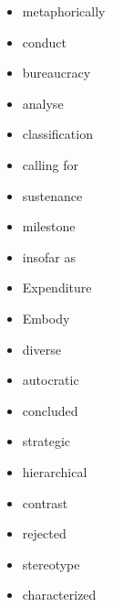 \documentclass[a4paper,10pt]{article}
\theoremstyle{discussion_style} \newtheorem{discussion}{\color{red}{Discussion point}}
\theoremstyle{theorem_style} \newtheorem{theorem}{Theorem}
\begin{document}
\newpage
\begin{itemize}
\item metaphorically
\item conduct
\item bureaucracy
\item analyse
\item classification
\item calling for
\item sustenance
\item milestone
\item insofar as
\item Expenditure
\item Embody
\item diverse
\item autocratic
\item concluded
\item strategic
\item hierarchical
\item contrast
\item rejected
\item stereotype
\item characterized
\end{itemize}
\end{document}
